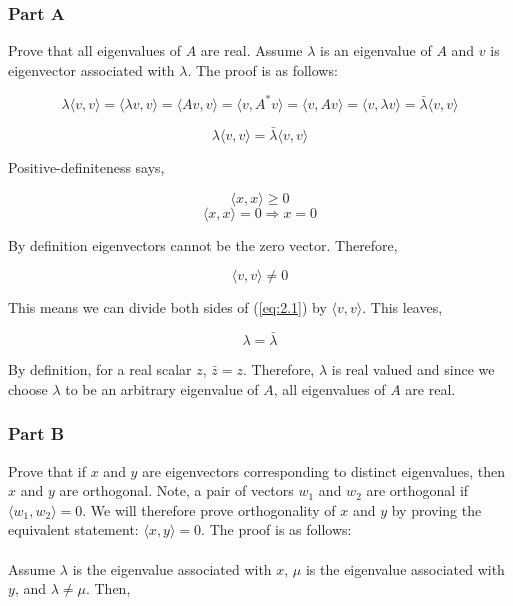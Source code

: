 \subsubsection{Part A}

Prove that all eigenvalues of \(A\) are real.
Assume \( \lambda \) is an eigenvalue of \(A\) and \(v\) is eigenvector associated with \( \lambda \).
The proof is as follows:

\begin{equation}
  \lambda \langle v,v \rangle 
  = \langle \lambda v,v \rangle 
  = \langle Av,v \rangle
  = \langle v,A^{*}v \rangle
  = \langle v,Av \rangle
  = \langle v,\lambda v \rangle
  = \bar{\lambda} \langle v,v \rangle
\end{equation}

\begin{equation}
  \lambda \langle v,v \rangle
  = \bar{\lambda} \langle v,v \rangle
\label{eq:2.1}
\end{equation}

Positive-definiteness says,

\begin{equation}
  \langle x,x \rangle \geq 0
\end{equation}
\begin{equation}
  \langle x,x \rangle = 0 \Rightarrow x = 0
\end{equation}

By definition eigenvectors cannot be the zero vector.
Therefore,

\begin{equation}
  \langle v,v \rangle \ne 0
\end{equation}

This means we can divide both sides of (\ref{eq:2.1}) by \( \langle v,v \rangle \).
This leaves,

\begin{equation}
  \lambda = \bar{\lambda}
\end{equation}

By definition, for a real scalar \(z\), \(\bar{z} = z\).
Therefore, \( \lambda \) is real valued and since we choose \(\lambda\) to be an arbitrary eigenvalue of \(A\), all eigenvalues of \(A\) are real.

\newpage
\subsubsection{Part B}

Prove that if \(x\) and \(y\) are eigenvectors corresponding to distinct eigenvalues, then \(x\) and \(y\) are orthogonal.
Note, a pair of vectors \(w_1\) and \(w_2\) are orthogonal if \( \langle w_1,w_2 \rangle = 0\).
We will therefore prove orthogonality of \(x\) and \(y\) by proving the equivalent statement: \( \langle x,y \rangle = 0 \).
The proof is as follows:
\\
\\
\indent Assume \(\lambda\) is the eigenvalue associated with \(x\), \(\mu\) is the eigenvalue associated with \(y\), and \(\lambda \ne \mu\).
Then,

